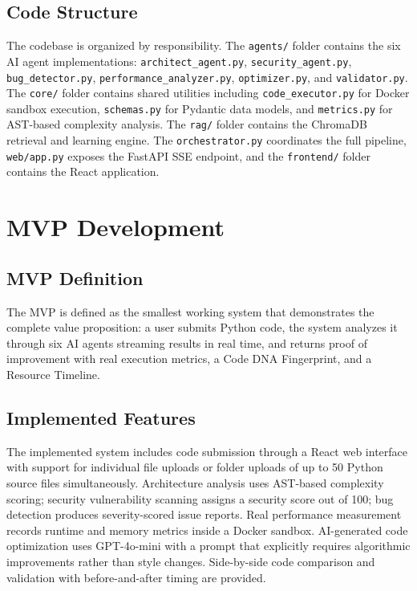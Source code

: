 \subsection{Code Structure}
The codebase is organized by responsibility. The \texttt{agents/} folder contains the six AI agent implementations: \texttt{architect\_agent.py}, \texttt{security\_agent.py}, \texttt{bug\_detector.py}, \texttt{performance\_analyzer.py}, \texttt{optimizer.py}, and \texttt{validator.py}. The \texttt{core/} folder contains shared utilities including \texttt{code\_executor.py} for Docker sandbox execution, \texttt{schemas.py} for Pydantic data models, and \texttt{metrics.py} for AST-based complexity analysis. The \texttt{rag/} folder contains the ChromaDB retrieval and learning engine. The \texttt{orchestrator.py} coordinates the full pipeline, \texttt{web/app.py} exposes the FastAPI SSE endpoint, and the \texttt{frontend/} folder contains the React application.

\clearpage
\section{MVP Development}
\label{sec:mvp}

\subsection{MVP Definition}
The MVP is defined as the smallest working system that demonstrates the complete value proposition: a user submits Python code, the system analyzes it through six AI agents streaming results in real time, and returns proof of improvement with real execution metrics, a Code DNA Fingerprint, and a Resource Timeline.

\subsection{Implemented Features}
The implemented system includes code submission through a React web interface with support for individual file uploads or folder uploads of up to 50 Python source files simultaneously. Architecture analysis uses AST-based complexity scoring; security vulnerability scanning assigns a security score out of 100; bug detection produces severity-scored issue reports. Real performance measurement records runtime and memory metrics inside a Docker sandbox. AI-generated code optimization uses GPT-4o-mini with a prompt that explicitly requires algorithmic improvements rather than style changes. Side-by-side code comparison and validation with before-and-after timing are provided.

